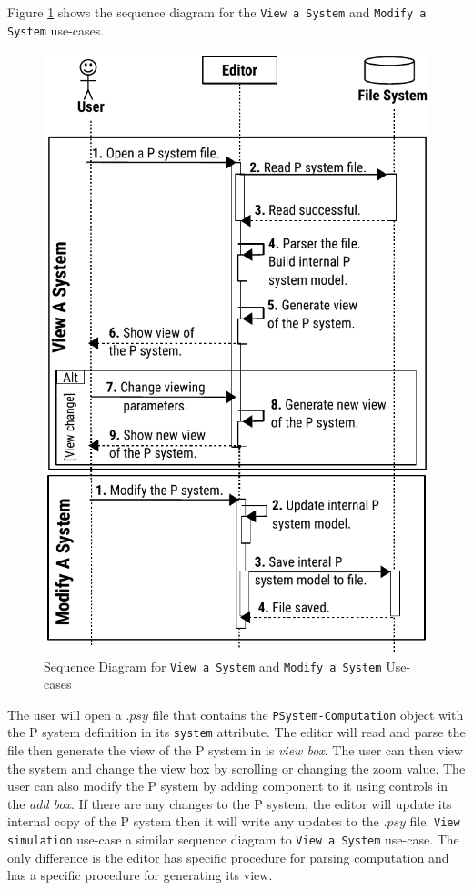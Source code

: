 \documentclass{article}
\begin{document}
Figure \ref{fig:sequence-modify} shows the sequence diagram for the \texttt{View a System} and 
\texttt{Modify a System} use-cases.

\begin{figure}[H]
\begin{center}
\includegraphics[scale=0.90]{figures/zzz-sequence-modify.pdf}
\caption{Sequence Diagram for \texttt{View a System} and \texttt{Modify a System} Use-cases}
\label{fig:sequence-modify}
\end{center}
\end{figure}

The user will open a $.psy$ file that contains the \texttt{PSystem-Computation} object with the
P system definition in its \texttt{system} attribute. The editor will read and parse the file then
generate the view of the P system in is \textit{view box}. The user can then view the system and
change the view box by scrolling or changing the zoom value. The user can also modify the P system
by adding component to it using controls in the \textit{add box}. If there are any changes to the
P system, the editor will update its internal copy of the P system then it will write any updates
to the $.psy$ file. \texttt{View simulation} use-case a similar sequence diagram to \texttt{View
a System} use-case. The only difference is the editor has specific procedure for parsing 
computation and has a specific procedure for generating its view.
\end{document}
